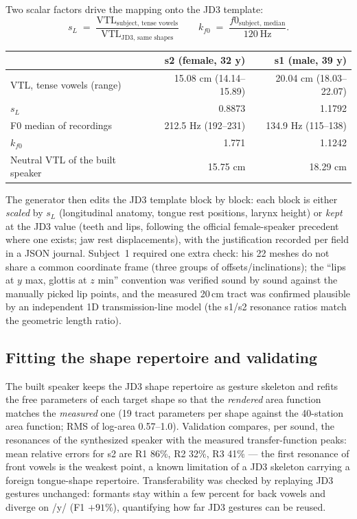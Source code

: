 \documentclass[11pt,a4paper]{article}
\begin{document}
Two scalar factors drive the mapping onto the JD3 template:
\begin{equation}
s_L \;=\; \frac{\mathrm{VTL}_{\text{subject, tense vowels}}}
               {\mathrm{VTL}_{\text{JD3, same shapes}}}
\qquad
k_{f0} \;=\; \frac{f0_{\text{subject, median}}}{120~\text{Hz}} .
\end{equation}

\begin{center}
\small
\begin{tabular}{@{}lrr@{}}
\toprule
 & \textbf{s2 (female, 32 y)} & \textbf{s1 (male, 39 y)} \\
\midrule
VTL, tense vowels (range) & 15.08 cm (14.14--15.89) & 20.04 cm (18.03--22.07) \\
$s_L$                     & 0.8873 & 1.1792 \\
F0 median of recordings   & 212.5 Hz (192--231) & 134.9 Hz (115--138) \\
$k_{f0}$                  & 1.771 & 1.1242 \\
Neutral VTL of the built speaker & 15.75 cm & 18.29 cm \\
\bottomrule
\end{tabular}
\end{center}

The generator then edits the JD3 template block by block: each block
is either \emph{scaled} by $s_L$ (longitudinal anatomy, tongue rest
positions, larynx height) or \emph{kept} at the JD3 value (teeth and
lips, following the official female-speaker precedent where one
exists; jaw rest displacements), with the justification recorded per
field in a JSON journal. Subject~1 required one extra check: his 22
meshes do not share a common coordinate frame (three groups of
offsets/inclinations); the ``lips at $y$ max, glottis at $z$ min''
convention was verified sound by sound against the manually picked
lip points, and the measured 20\,cm tract was confirmed plausible by
an independent 1D transmission-line model (the s1/s2 resonance ratios
match the geometric length ratio).

\subsection{Fitting the shape repertoire and validating}

The built speaker keeps the JD3 shape repertoire as gesture skeleton
and refits the free parameters of each target shape so that the
\emph{rendered} area function matches the \emph{measured} one
(19 tract parameters per shape against the 40-station area function;
RMS of log-area 0.57--1.0). Validation compares, per sound, the
resonances of the synthesized speaker with the measured
transfer-function peaks: mean relative errors for s2 are R1 86\%,
R2 32\%, R3 41\% --- the first resonance of front vowels is the
weakest point, a known limitation of a JD3 skeleton carrying a
foreign tongue-shape repertoire. Transferability was checked by
replaying JD3 gestures unchanged: formants stay within a few percent
for back vowels and diverge on /y/ (F1 $+91\%$), quantifying how far
JD3 gestures can be reused.
\end{document}

